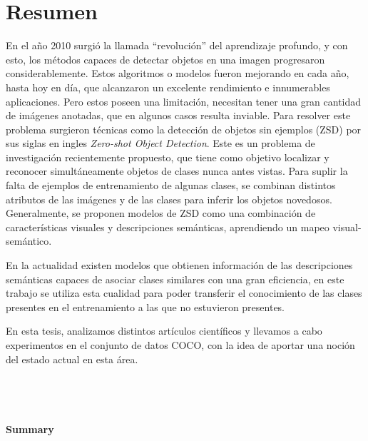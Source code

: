 \documentclass[12pt,twosided]{book}
\begin{document}
\chapter*{Resumen}

\pagestyle{plain}

En el año 2010 surgió la llamada ``revolución'' del aprendizaje profundo, y con esto, los métodos capaces de detectar objetos en una imagen progresaron considerablemente. Estos algoritmos o modelos fueron mejorando en cada año, hasta hoy en día, que alcanzaron un excelente rendimiento e innumerables aplicaciones. Pero estos poseen una limitación, necesitan tener una gran cantidad de imágenes anotadas, que en algunos casos resulta inviable. Para resolver este problema surgieron técnicas como la detección de objetos sin ejemplos (ZSD) por sus siglas en ingles \textit{Zero-shot Object Detection}. Este es un problema de investigación recientemente propuesto, que tiene como objetivo localizar y reconocer simultáneamente objetos de clases nunca antes vistas. Para suplir la falta de ejemplos de entrenamiento de algunas clases, se combinan distintos atributos de las imágenes y de las clases para inferir los objetos novedosos. Generalmente, se proponen modelos de ZSD como una combinación de características visuales y descripciones semánticas, aprendiendo un mapeo visual-semántico. 

En la actualidad existen modelos que obtienen información de las descripciones semánticas capaces de asociar clases similares con una gran eficiencia, en este trabajo se utiliza esta cualidad para poder transferir el conocimiento de las clases presentes en el entrenamiento a las que no estuvieron presentes.


En esta tesis, analizamos distintos artículos científicos y llevamos a cabo experimentos en el conjunto de datos COCO, con la idea de aportar una noción del estado actual en esta área. \\ \\ \\ \\ \\
{\huge\textbf{Summary}}\\\\


\begingroup
\hypersetup{hidelinks}
\tableofcontents
\endgroup
\end{document}
